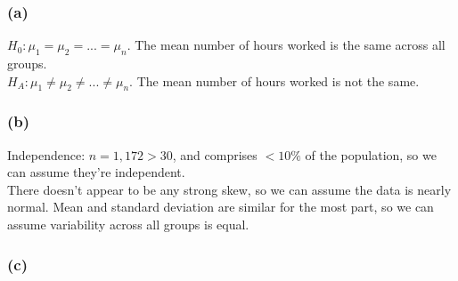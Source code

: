 \documentclass[]{article}
\begin{document}
\subsubsection{(a)}\label{a-2}

\(H_0: \mu_1 = \mu_2 = ... = \mu_n\). The mean number of hours worked is
the same across all groups.\\
\(H_A: \mu_1 \neq \mu_2 \neq ... \neq \mu_n\). The mean number of hours
worked is not the same.

\subsubsection{(b)}\label{b-2}

Independence: \(n = 1,172 > 30\), and comprises \(< 10\%\) of the
population, so we can assume they're independent.\\
There doesn't appear to be any strong skew, so we can assume the data is
nearly normal. Mean and standard deviation are similar for the most
part, so we can assume variability across all groups is equal.

\subsubsection{(c)}\label{c-2}
\end{document}
